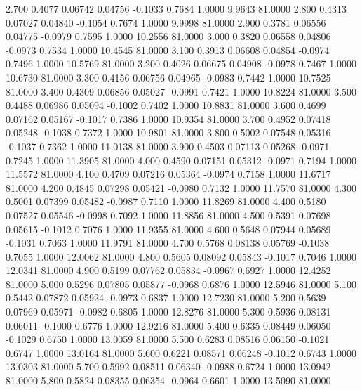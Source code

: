    2.700   0.4077   0.06742   0.04756  -0.1033   0.7684   1.0000   9.9643  81.0000
   2.800   0.4313   0.07027   0.04840  -0.1054   0.7674   1.0000   9.9998  81.0000
   2.900   0.3781   0.06556   0.04775  -0.0979   0.7595   1.0000  10.2556  81.0000
   3.000   0.3820   0.06558   0.04806  -0.0973   0.7534   1.0000  10.4545  81.0000
   3.100   0.3913   0.06608   0.04854  -0.0974   0.7496   1.0000  10.5769  81.0000
   3.200   0.4026   0.06675   0.04908  -0.0978   0.7467   1.0000  10.6730  81.0000
   3.300   0.4156   0.06756   0.04965  -0.0983   0.7442   1.0000  10.7525  81.0000
   3.400   0.4309   0.06856   0.05027  -0.0991   0.7421   1.0000  10.8224  81.0000
   3.500   0.4488   0.06986   0.05094  -0.1002   0.7402   1.0000  10.8831  81.0000
   3.600   0.4699   0.07162   0.05167  -0.1017   0.7386   1.0000  10.9354  81.0000
   3.700   0.4952   0.07418   0.05248  -0.1038   0.7372   1.0000  10.9801  81.0000
   3.800   0.5002   0.07548   0.05316  -0.1037   0.7362   1.0000  11.0138  81.0000
   3.900   0.4503   0.07113   0.05268  -0.0971   0.7245   1.0000  11.3905  81.0000
   4.000   0.4590   0.07151   0.05312  -0.0971   0.7194   1.0000  11.5572  81.0000
   4.100   0.4709   0.07216   0.05364  -0.0974   0.7158   1.0000  11.6717  81.0000
   4.200   0.4845   0.07298   0.05421  -0.0980   0.7132   1.0000  11.7570  81.0000
   4.300   0.5001   0.07399   0.05482  -0.0987   0.7110   1.0000  11.8269  81.0000
   4.400   0.5180   0.07527   0.05546  -0.0998   0.7092   1.0000  11.8856  81.0000
   4.500   0.5391   0.07698   0.05615  -0.1012   0.7076   1.0000  11.9355  81.0000
   4.600   0.5648   0.07944   0.05689  -0.1031   0.7063   1.0000  11.9791  81.0000
   4.700   0.5768   0.08138   0.05769  -0.1038   0.7055   1.0000  12.0062  81.0000
   4.800   0.5605   0.08092   0.05843  -0.1017   0.7046   1.0000  12.0341  81.0000
   4.900   0.5199   0.07762   0.05834  -0.0967   0.6927   1.0000  12.4252  81.0000
   5.000   0.5296   0.07805   0.05877  -0.0968   0.6876   1.0000  12.5946  81.0000
   5.100   0.5442   0.07872   0.05924  -0.0973   0.6837   1.0000  12.7230  81.0000
   5.200   0.5639   0.07969   0.05971  -0.0982   0.6805   1.0000  12.8276  81.0000
   5.300   0.5936   0.08131   0.06011  -0.1000   0.6776   1.0000  12.9216  81.0000
   5.400   0.6335   0.08449   0.06050  -0.1029   0.6750   1.0000  13.0059  81.0000
   5.500   0.6283   0.08516   0.06150  -0.1021   0.6747   1.0000  13.0164  81.0000
   5.600   0.6221   0.08571   0.06248  -0.1012   0.6743   1.0000  13.0303  81.0000
   5.700   0.5992   0.08511   0.06340  -0.0988   0.6724   1.0000  13.0942  81.0000
   5.800   0.5824   0.08355   0.06354  -0.0964   0.6601   1.0000  13.5090  81.0000
